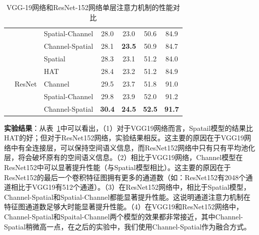 \begin{table}[htbp]
{\begin{tabular}{|l| l |l| c c c c|}
& & Spatial-Channel &28.0 &23.0 & 50.6& 84.9\\
& & Channel-Spatial & 28.1 & \textbf{23.5} & 50.9& 84.7\\
\cline{2-7}
& \multirow{5}{*}{ResNet} & Spatial & 28.3 & 23.1 & 51.2 & 84.0 \\
&  & HAT & 28.4 & 23.2 & 51.2 & 84.9 \\
&  & Channel & 29.5 & 23.7 & 51.8 & 91.0 \\
& & Spatial-Channel &29.8 &23.9 & 52.0& 91.2\\
& & Channel-Spatial & \textbf{30.4} & \textbf{24.5} & \textbf{52.5} & \textbf{91.7}\\
\hline
\end{tabular}}
\caption{VGG-19网络和ResNet-152网络单层注意力机制的性能对比} 
\label{ch5:tab:Q1}
\end{table}


\textbf{实验结果}：从表~\ref{ch5:tab:Q1}中可以看出，（1）对于VGG19网络而言，Spatail模型的结果比HAT的好；但对于ResNet152网络，实验结果相反。这主要的原因在于VGG19网络中有全连接层，可以保持空间语义信息，而ResNet152网络中只有只有平均池化层，将会破坏原有的空间语义信息。（2）相比于VGG19网络，Channel模型在ResNet152中可以显著提升性能（与Spatial模型相比）。这主要的原因在于ResNet152的最后一个卷积特征图拥有更多的通道数（如：ResNet152有2048个通道相比于VGG19有512个通道）。（3）在ResNet152网络中，相比于Spatial模型，Channel-Spatial和Spatial-Channel都能显著提升性能。这说明通道注意力机制在特征图通道数足够大时能显著提升性能。（4）在VGG19和ResNet152网络中，Channel-Spatial和Spaital-Channel两个模型的效果都非常接近，其中Channel-Spatial稍微高一点，在之后的实验中，我们使用Channel-Spatial作为融合方式。


